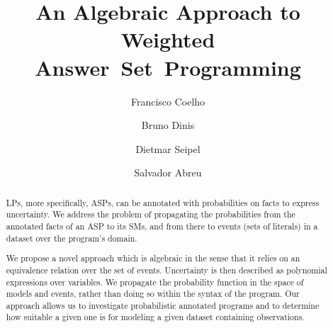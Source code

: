 \documentclass[x11names]{tlp}
\begin{document}

\title{%
	An Algebraic Approach to Weighted
	Answer~Set~Programming
}
\ifTLP

	\begin{authgrp}
		\author{ }

		\author{ }

		\author{ }

		\author{ }
	\end{authgrp}
\else
	\author{%
		Francisco Coelho   \and %
		Bruno Dinis        \and %
		Dietmar Seipel       \and %
		Salvador Abreu     %
	}
\fi

\maketitle

\begin{abstract}
	\Aclp{LP}, more specifically, \Aclp{ASP}, can be annotated with
	probabilities on facts to express uncertainty.  We address the
	problem of propagating the probabilities from the annotated facts of
	an \acl{ASP} to its \aclp{SM}, and from there to events (sets of literals) in a dataset over the program's
	domain. %

	We propose a novel approach which is algebraic in the sense that it relies on
	an equivalence relation over the set of events. Uncertainty is then described
	as polynomial expressions over variables. We propagate the probability
	function in the space of models and events, rather than doing so within the
	syntax of the program.
	Our approach allows us to investigate probabilistic annotated programs and to
	determine how suitable a given one is for modeling a given dataset containing
	observations.
\end{abstract}
\end{document}
